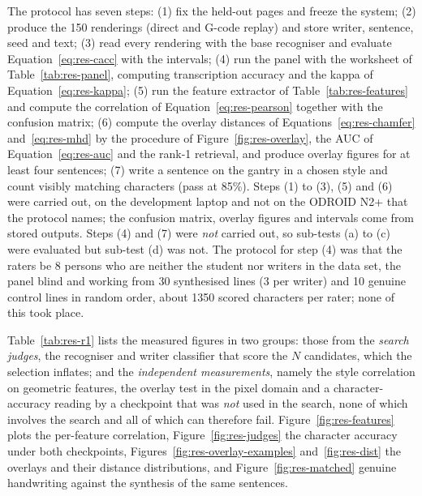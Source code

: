 
            The protocol has seven steps: (1) fix the held-out pages and freeze the system; (2) produce the 150 renderings (direct and G-code replay) and store writer, sentence, seed and text; (3) read every rendering with the base recogniser and evaluate Equation~\ref{eq:res-cacc} with the intervals; (4) run the panel with the worksheet of Table~\ref{tab:res-panel}, computing transcription accuracy and the kappa of Equation~\ref{eq:res-kappa}; (5) run the feature extractor of Table~\ref{tab:res-features} and compute the correlation of Equation~\ref{eq:res-pearson} together with the confusion matrix; (6) compute the overlay distances of Equations~\ref{eq:res-chamfer} and~\ref{eq:res-mhd} by the procedure of Figure~\ref{fig:res-overlay}, the AUC of Equation~\ref{eq:res-auc} and the rank-1 retrieval, and produce overlay figures for at least four sentences; (7) write a sentence on the gantry in a chosen style and count visibly matching characters (pass at 85\%).
            Steps (1) to (3), (5) and (6) were carried out, on the development laptop and not on the ODROID N2+ that the protocol names; the confusion matrix, overlay figures and intervals come from stored outputs.
            Steps (4) and (7) were \emph{not} carried out, so sub-tests (a) to (c) were evaluated but sub-test (d) was not.
            The protocol for step (4) was that the raters be 8 persons who are neither the student nor writers in the data set, the panel blind and working from 30 synthesised lines (3 per writer) and 10 genuine control lines in random order, about 1350 scored characters per rater; none of this took place.


            Table~\ref{tab:res-r1} lists the measured figures in two groups: those from the \emph{search judges}, the recogniser and writer classifier that score the $N$ candidates, which the selection inflates; and the \emph{independent measurements}, namely the style correlation on geometric features, the overlay test in the pixel domain and a character-accuracy reading by a checkpoint that was \emph{not} used in the search, none of which involves the search and all of which can therefore fail.
            Figure~\ref{fig:res-features} plots the per-feature correlation, Figure~\ref{fig:res-judges} the character accuracy under both checkpoints, Figures~\ref{fig:res-overlay-examples} and~\ref{fig:res-dist} the overlays and their distance distributions, and Figure~\ref{fig:res-matched} genuine handwriting against the synthesis of the same sentences.

